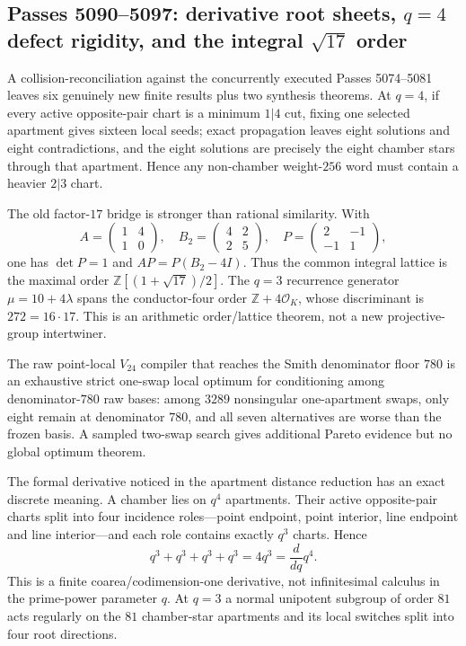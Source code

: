 \ifdefined\WPassFiveZeroNineZeroLoaded\else
\gdef\WPassFiveZeroNineZeroLoaded{1}
\subsection*{Passes 5090--5097: derivative root sheets, $q=4$ defect rigidity, and the integral $\sqrt{17}$ order}
A collision-reconciliation against the concurrently executed Passes 5074--5081 leaves six genuinely new finite results plus two synthesis theorems.  At $q=4$, if every active opposite-pair chart is a minimum $1|4$ cut, fixing one selected apartment gives sixteen local seeds; exact propagation leaves eight solutions and eight contradictions, and the eight solutions are precisely the eight chamber stars through that apartment.  Hence any non-chamber weight-$256$ word must contain a heavier $2|3$ chart.

The old factor-$17$ bridge is stronger than rational similarity.  With
\[
 A=\begin{pmatrix}1&4\\1&0\end{pmatrix},\quad
 B_2=\begin{pmatrix}4&2\\2&5\end{pmatrix},\quad
 P=\begin{pmatrix}2&-1\\-1&1\end{pmatrix},
\]
one has $\det P=1$ and $AP=P(B_2-4I)$.  Thus the common integral lattice is the maximal order $\mathbb Z[(1+\sqrt{17})/2]$.  The $q=3$ recurrence generator $\mu=10+4\lambda$ spans the conductor-four order $\mathbb Z+4\mathcal O_K$, whose discriminant is $272=16\cdot17$.  This is an arithmetic order/lattice theorem, not a new projective-group intertwiner.

The raw point-local $V_{24}$ compiler that reaches the Smith denominator floor $780$ is an exhaustive strict one-swap local optimum for conditioning among denominator-$780$ raw bases: among $3289$ nonsingular one-apartment swaps, only eight remain at denominator $780$, and all seven alternatives are worse than the frozen basis.  A sampled two-swap search gives additional Pareto evidence but no global optimum theorem.

The formal derivative noticed in the apartment distance reduction has an exact discrete meaning.  A chamber lies on $q^4$ apartments.  Their active opposite-pair charts split into four incidence roles---point endpoint, point interior, line endpoint and line interior---and each role contains exactly $q^3$ charts.  Hence
\[
 q^3+q^3+q^3+q^3=4q^3=\frac{d}{dq}q^4.
\]
This is a finite coarea/codimension-one derivative, not infinitesimal calculus in the prime-power parameter $q$.  At $q=3$ a normal unipotent subgroup of order $81$ acts regularly on the $81$ chamber-star apartments and its local switches split into four root directions.

